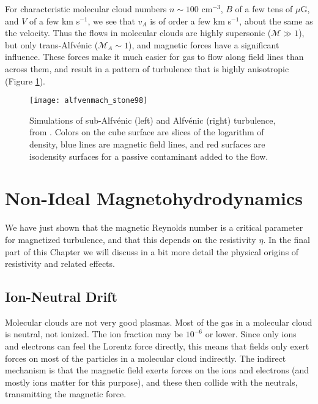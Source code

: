 For characteristic molecular cloud numbers $n\sim 100$ cm$^{-3}$, $B$ of a few tens of $\mu$G, and $V$ of a few km s$^{-1}$, we see that $v_A$ is of order a few km s$^{-1}$, about the same as the velocity. Thus the flows in molecular clouds are highly supersonic ($\mathcal{M}\gg 1$), but only trans-Alfv\'{e}nic ($\mathcal{M}_A \sim 1$), and magnetic forces have a significant influence. These forces make it much easier for gas to flow along field lines than across them, and result in a pattern of turbulence that is highly anisotropic (Figure \ref{fig:alfvenmach}).

\begin{figure}
\texttt{[image: alfvenmach\_stone98]}
\caption[Comparison of simulations of Alfv\'{e}nic and sub-Alfv\'{e}nic turbulence]{
\label{fig:alfvenmach}
Simulations of sub-Alfv\'{e}nic (left) and Alfv\'{e}nic (right) turbulence, from \citet{stone98a}. Colors on the cube surface are slices of the logarithm of density, blue lines are magnetic field lines, and red surfaces are isodensity surfaces for a passive contaminant added to the flow.
}
\end{figure}

\section{Non-Ideal Magnetohydrodynamics}
\label{sec:non-ideal-mhd}

We have just shown that the magnetic Reynolds number is a critical parameter for magnetized turbulence, and that this depends on the resistivity $\eta$. In the final part of this Chapter we will discuss in a bit more detail the physical origins of resistivity and related effects.

\subsection{Ion-Neutral Drift}

Molecular clouds are not very good plasmas. Most of the gas in a molecular cloud is neutral, not ionized. The ion fraction may be $10^{-6}$ or lower. Since only ions and electrons can feel the Lorentz force directly, this means that fields only exert forces on most of the particles in a molecular cloud indirectly. The indirect mechanism is that the magnetic field exerts forces on the ions and electrons (and mostly ions matter for this purpose), and these then collide with the neutrals, transmitting the magnetic force.

